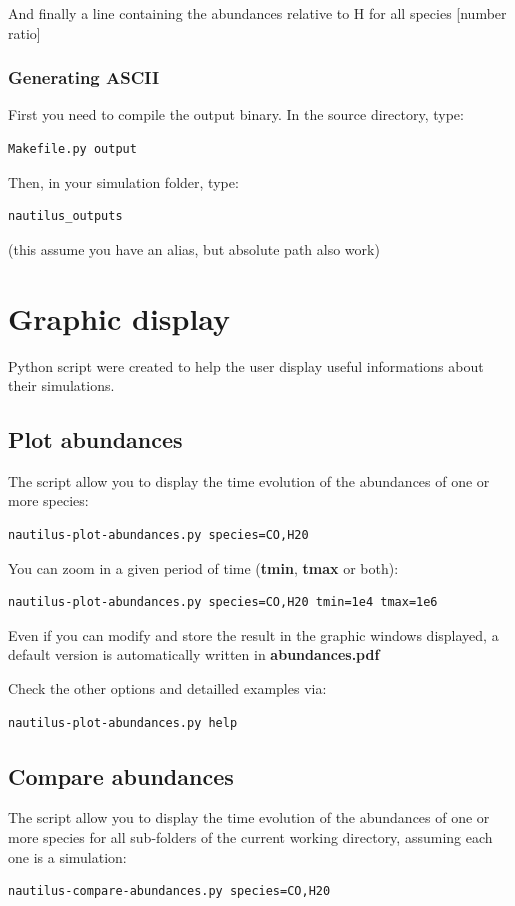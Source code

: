 \documentclass[english,a4paper,twoside]{article}
\begin{document}
And finally a line containing the abundances relative to H for all species [number ratio]

\subsubsection{Generating ASCII}
First you need to compile the output binary. In the source directory, type:
\begin{verbatim}
Makefile.py output
\end{verbatim}

Then, in your simulation folder, type:
\begin{verbatim}
nautilus_outputs
\end{verbatim}
(this assume you have an alias, but absolute path also work)

\section{Graphic display}
Python script were created to help the user display useful informations about their simulations. 

\subsection{Plot abundances}
The script  allow you to display the time evolution of the abundances of one or more species:
\begin{verbatim}
nautilus-plot-abundances.py species=CO,H20
\end{verbatim}

You can zoom in a given period of time (\textbf{tmin}, \textbf{tmax} or both):
\begin{verbatim}
nautilus-plot-abundances.py species=CO,H20 tmin=1e4 tmax=1e6
\end{verbatim}

Even if you can modify and store the result in the graphic windows displayed, a default version is automatically written in \textbf{abundances.pdf} 

Check the other options and detailled examples via:
\begin{verbatim}
nautilus-plot-abundances.py help
\end{verbatim}

\subsection{Compare abundances}
The script  allow you to display the time evolution of the abundances of one or more species for all sub-folders of the current working directory, assuming each one is a simulation:
\begin{verbatim}
nautilus-compare-abundances.py species=CO,H20
\end{verbatim}
\end{document}
